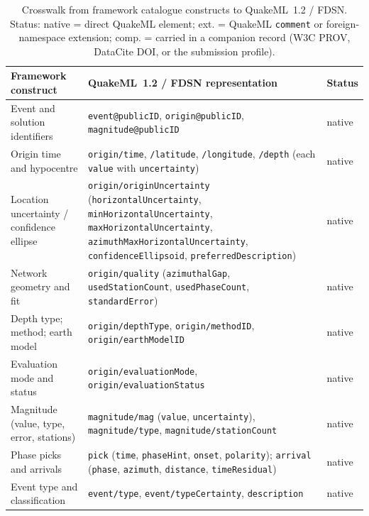 \documentclass[11pt]{article}
\begin{document}
\begin{table}[H]
\centering
\small
\caption{Crosswalk from framework catalogue constructs to QuakeML~1.2 / FDSN. Status: \textsf{native} = direct QuakeML element; \textsf{ext.} = QuakeML \texttt{comment} or foreign-namespace extension; \textsf{comp.} = carried in a companion record (W3C PROV, DataCite DOI, or the submission profile).}
\label{tab:quakeml_crosswalk}
\setlength{\tabcolsep}{5pt}
\renewcommand{\arraystretch}{1.2}
\begin{tabular}{p{3.5cm} p{8.2cm} p{1.5cm}}
\toprule
\textbf{Framework construct} & \textbf{QuakeML~1.2 / FDSN representation} & \textbf{Status} \\
\midrule
Event and solution identifiers & \texttt{event@publicID}, \texttt{origin@publicID}, \texttt{magnitude@publicID} & \textsf{native} \\
Origin time and hypocentre & \texttt{origin/time}, \texttt{/latitude}, \texttt{/longitude}, \texttt{/depth} (each \texttt{value} with \texttt{uncertainty}) & \textsf{native} \\
Location uncertainty / confidence ellipse & \texttt{origin/originUncertainty} (\texttt{horizontalUncertainty}, \texttt{minHorizontalUncertainty}, \texttt{maxHorizontalUncertainty}, \texttt{azimuthMaxHorizontalUncertainty}, \texttt{confidenceEllipsoid}, \texttt{preferredDescription}) & \textsf{native} \\
Network geometry and fit & \texttt{origin/quality} (\texttt{azimuthalGap}, \texttt{usedStationCount}, \texttt{usedPhaseCount}, \texttt{standardError}) & \textsf{native} \\
Depth type; method; earth model & \texttt{origin/depthType}, \texttt{origin/methodID}, \texttt{origin/earthModelID} & \textsf{native} \\
Evaluation mode and status & \texttt{origin/evaluationMode}, \texttt{origin/evaluationStatus} & \textsf{native} \\
Magnitude (value, type, error, stations) & \texttt{magnitude/mag} (\texttt{value}, \texttt{uncertainty}), \texttt{magnitude/type}, \texttt{magnitude/stationCount} & \textsf{native} \\
Phase picks and arrivals & \texttt{pick} (\texttt{time}, \texttt{phaseHint}, \texttt{onset}, \texttt{polarity}); \texttt{arrival} (\texttt{phase}, \texttt{azimuth}, \texttt{distance}, \texttt{timeResidual}) & \textsf{native} \\
Event type and classification & \texttt{event/type}, \texttt{event/typeCertainty}, \texttt{description} & \textsf{native} \\

\end{tabular}
\end{table}
\end{document}
